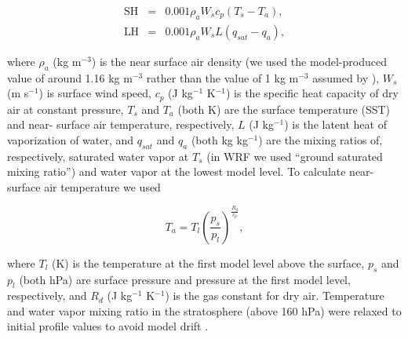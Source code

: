 \documentclass[draft]{agujournal2019}
\begin{document}
\begin{eqnarray}
\textrm{SH} &=& 0.001 \rho_a W_s c_p (T_s - T_a), \\
\textrm{LH} &=& 0.001 \rho_a W_s L (q_{sat} - q_a), \label{eq:LH}
\end{eqnarray}

\noindent where $\rho_a$ (kg m$^{-3}$) is the near surface air density (we used
the model-produced value of around 1.16 kg m$^{-3}$ rather than the value of 1
kg m$^{-3}$ assumed by ), $W_s$ (m s$^{-1}$) is surface
wind speed, $c_p$ (J kg$^{-1}$ K$^{-1}$) is the specific heat capacity of dry
air at constant pressure, $T_s$ and $T_a$ (both K) are the surface temperature
(SST) and near- surface air temperature, respectively,  $L$ (J kg$^{-1}$) is the
latent heat of vaporization of water, and $q_{sat}$ and $q_a$ (both kg
kg$^{-1}$) are the mixing ratios of, respectively, saturated water vapor at
$T_s$ (in WRF we used ``ground saturated mixing ratio'') and water vapor at the
lowest model level. To calculate near- surface air temperature we used

\begin{equation}
T_a = T_l \left(\frac{p_s}{p_l}\right)^{\frac{R_d}{c_p}},
\end{equation}

\noindent where $T_l$ (K) is the temperature at the first model level above the
surface, $p_s$ and $p_l$ (both hPa) are surface pressure and pressure at the
first model level, respectively, and $R_d$ (J kg$^{-1}$ K$^{-1}$) is the gas
constant for dry air. Temperature and water vapor mixing ratio in the
stratosphere (above 160 hPa) were relaxed to initial profile values to avoid
model drift \cite{Herman_JAMES_2013}.
\end{document}

